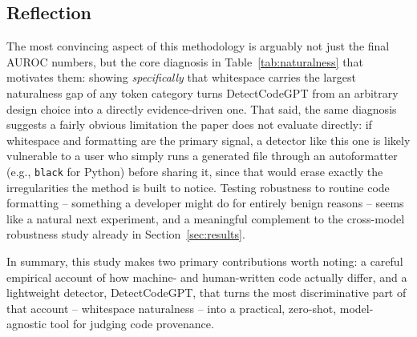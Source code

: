 \documentclass[manuscript,review]{acmart}
\begin{document}
\subsection{Reflection}
The most convincing aspect of this methodology is arguably not just the final AUROC numbers, but the core diagnosis in Table~\ref{tab:naturalness} that motivates them: showing \emph{specifically} that whitespace carries the largest naturalness gap of any token category turns DetectCodeGPT from an arbitrary design choice into a directly evidence-driven one. That said, the same diagnosis suggests a fairly obvious limitation the paper does not evaluate directly: if whitespace and formatting are the primary signal, a detector like this one is likely vulnerable to a user who simply runs a generated file through an autoformatter (e.g., \texttt{black} for Python) before sharing it, since that would erase exactly the irregularities the method is built to notice. Testing robustness to routine code formatting -- something a developer might do for entirely benign reasons -- seems like a natural next experiment, and a meaningful complement to the cross-model robustness study already in Section~\ref{sec:results}.

In summary, this study makes two primary contributions worth noting: a careful empirical account of how machine- and human-written code actually differ, and a lightweight detector, DetectCodeGPT, that turns the most discriminative part of that account -- whitespace naturalness -- into a practical, zero-shot, model-agnostic tool for judging code provenance.




\end{document}
